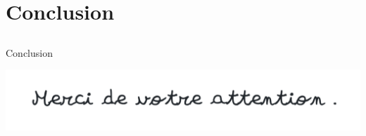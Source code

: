 \documentclass[11pt,english,ignorenonframetext,]{beamer}
\newcommand{\Fontify}{}
\providecommand{\tightlist}{%
  \setlength{\itemsep}{0pt}\setlength{\parskip}{0pt}}
\begin{document}










\section{\hfill{}Conclusion\hfill{}}
\subsection{}


\begin{frame}{Conclusion}

\begin{center}
  \includegraphics[width=0.80\linewidth,right]{figures/merci_ecriture_manuelle.png}
\end{center}


\end{frame}
\end{document}
